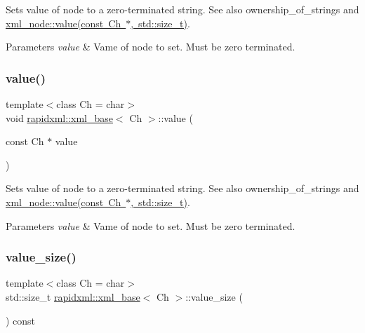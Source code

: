 Sets value of node to a zero-\/terminated string. See also ownership\+\_\+of\+\_\+strings and \mbox{\hyperlink{classrapidxml_1_1xml__base_a3b183c2db7022a6d30494dd2f0ac11e9}{xml\+\_\+node\+::value(const Ch $\ast$, std\+::size\+\_\+t)}}. 
\begin{DoxyParams}{Parameters}
{\em value} & Vame of node to set. Must be zero terminated. \\
\hline
\end{DoxyParams}
\mbox{\label{classrapidxml_1_1xml__base_a81e63ec4bfd2d7ef0a6c2ed49be6e623}} 
\subsubsection{\texorpdfstring{value()}{value()}\hspace{0.1cm}{\footnotesize\ttfamily [6/6]}}
{\footnotesize\ttfamily template$<$class Ch  = char$>$ \\
void \mbox{\hyperlink{classrapidxml_1_1xml__base}{rapidxml\+::xml\+\_\+base}}$<$ Ch $>$\+::value (\begin{DoxyParamCaption}\item[{const Ch $\ast$}]{value }\end{DoxyParamCaption})\hspace{0.3cm}{\ttfamily [inline]}}

Sets value of node to a zero-\/terminated string. See also ownership\+\_\+of\+\_\+strings and \mbox{\hyperlink{classrapidxml_1_1xml__base_a3b183c2db7022a6d30494dd2f0ac11e9}{xml\+\_\+node\+::value(const Ch $\ast$, std\+::size\+\_\+t)}}. 
\begin{DoxyParams}{Parameters}
{\em value} & Vame of node to set. Must be zero terminated. \\
\hline
\end{DoxyParams}
\mbox{\label{classrapidxml_1_1xml__base_a2eb123d471b1567fa4832b6ee2b75493}} 
\subsubsection{\texorpdfstring{value\+\_\+size()}{value\_size()}\hspace{0.1cm}{\footnotesize\ttfamily [1/2]}}
{\footnotesize\ttfamily template$<$class Ch  = char$>$ \\
std\+::size\+\_\+t \mbox{\hyperlink{classrapidxml_1_1xml__base}{rapidxml\+::xml\+\_\+base}}$<$ Ch $>$\+::value\+\_\+size (\begin{DoxyParamCaption}{ }\end{DoxyParamCaption}) const\hspace{0.3cm}{\ttfamily [inline]}}

